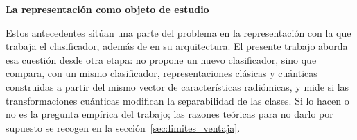 \textbf{La representación como objeto de estudio}

Estos antecedentes sitúan una parte del problema en la representación con la que trabaja el clasificador, además de en su arquitectura. El presente trabajo aborda esa cuestión desde otra etapa: no propone un nuevo clasificador, sino que compara, con un mismo clasificador, representaciones clásicas y cuánticas construidas a partir del mismo vector de características radiómicas, y mide si las transformaciones cuánticas modifican la separabilidad de las clases. Si lo hacen o no es la pregunta empírica del trabajo; las razones teóricas para no darlo por supuesto se recogen en la sección~\ref{sec:limites_ventaja}.
